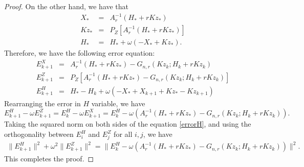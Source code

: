 \begin{itemize}
\begin{proof}
On the other hand, we have that 
\begin{eqnarray*}
X_{*} &=& A_r^{-1} (H_* + r K z_*) \\
Kz_{*} &=& P_Z [A_r^{-1}(H_* + rK z_*)] \\ 
H_{*} &=& H_* + \omega (-X_{*} + K z_{*}). 
\end{eqnarray*}
Therefore, we have the following error equation: 
\begin{eqnarray*}
E_{k+1}^X &=& A_r^{-1} (H_* + r K z_*) - G_{n,r} (Kz_k; H_k + r K z_k) \\
E_{k+1}^Z &=& P_Z [ A_r^{-1} (H_* + rK z_*) - G_{n,r}(Kz_k; H_k + rK z_k) ] \\
E_{k+1}^H &=& H_* - H_k + \omega (-X_* + X_{k+1} + Kz_{*} - K z_{k+1})
\end{eqnarray*}
Rearranging the error in $H$ variable, we have 
\begin{equation}\label{errorH}
E_{k+1}^H - \omega E_{k+1}^Z = E_k^H - \omega E_{k+1}^X = E_k^H - \omega \left( A_r^{-1} (H_* + r K z_*) - G_{n,r}(Kz_k; H_k + r K z_k) \right).    
\end{equation}
Taking the squared norm on both sides of the equation \eqref{errorH}, and using the orthogonality between $E_i^H$ and $E_j^Z$ for all $i,j$, we have 
\begin{eqnarray*}
\|E_{k+1}^H\|^2 + \omega^2 \|E_{k+1}^Z\|^2 = \|E_k^H - \omega (A_r^{-1} (H_* + r K z_*) - G_{n,r} (Kz_k; H_k + r K z_k))\|^2. 
\end{eqnarray*}
This completes the proof. 



\end{proof}
\end{itemize}
